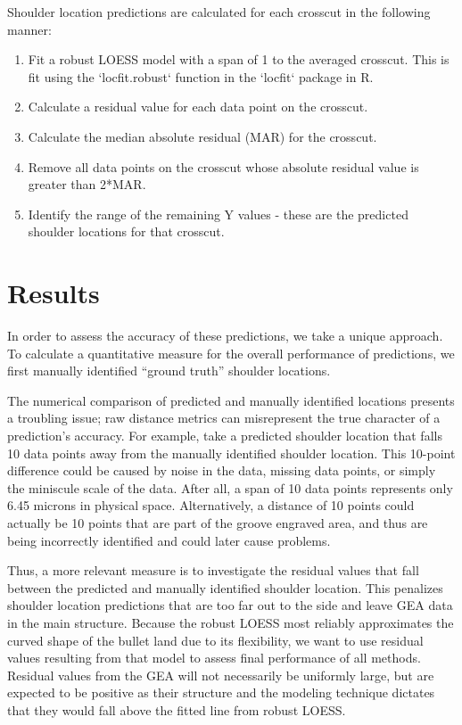 \documentclass[12pt]{article}
\begin{document}
Shoulder location predictions are calculated for each crosscut in the
following manner:

\begin{enumerate}
\item Fit a robust LOESS model with a span of 1 to the averaged crosscut. This is fit using the `locfit.robust` function in the `locfit` package in R.
\item Calculate a residual value for each data point on the crosscut.  
\item Calculate the median absolute residual (MAR) for the crosscut.  
\item Remove all data points on the crosscut whose absolute residual value is greater than 2*MAR.  
\item Identify the range of the remaining Y values - these are the predicted shoulder locations for that crosscut.   
\end{enumerate}

\section{Results}

In order to assess the accuracy of these predictions, we take a unique
approach. To calculate a quantitative measure for the overall
performance of predictions, we first manually identified ``ground
truth'' shoulder locations.

The numerical comparison of predicted and manually identified locations
presents a troubling issue; raw distance metrics can misrepresent the
true character of a prediction's accuracy. For example, take a predicted
shoulder location that falls 10 data points away from the manually
identified shoulder location. This 10-point difference could be caused
by noise in the data, missing data points, or simply the miniscule scale
of the data. After all, a span of 10 data points represents only 6.45
microns in physical space. Alternatively, a distance of 10 points could
actually be 10 points that are part of the groove engraved area, and
thus are being incorrectly identified and could later cause problems.

Thus, a more relevant measure is to investigate the residual values that
fall between the predicted and manually identified shoulder location.
This penalizes shoulder location predictions that are too far out to the
side and leave GEA data in the main structure. Because the robust LOESS
most reliably approximates the curved shape of the bullet land due to
its flexibility, we want to use residual values resulting from that
model to assess final performance of all methods. Residual values from
the GEA will not necessarily be uniformly large, but are expected to be
positive as their structure and the modeling technique dictates that
they would fall above the fitted line from robust LOESS.
\end{document}
